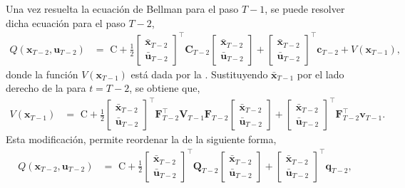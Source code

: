 Una vez resuelta la ecuación de Bellman para el paso $T-1$, se puede resolver dicha ecuación para el paso $T-2$,
\begin{align} \label{eq:Q_T_1}
    Q(\mathbf{x}_{T-2}, \mathbf{u}_{T-2})
    &= \text{ C} 
    +\frac{1}{2}
    \begin{bmatrix}
        \bar{\mathbf{x}}_{T-2} \\
        \bar{\mathbf{u}}_{T-2}
    \end{bmatrix}^{\top}
    \mathbf{C}_{T-2}
    \begin{bmatrix}
        \bar{\mathbf{x}}_{T-2} \\
        \bar{\mathbf{u}}_{T-2}
    \end{bmatrix}
    + 
    \begin{bmatrix}
        \bar{\mathbf{x}}_{T-2} \\
        \bar{\mathbf{u}}_{T-2}
    \end{bmatrix}^{\top}
    \mathbf{c}_{T-2}
    +
    V(\mathbf{x}_{T-1}),
\end{align}
donde la función $V(\mathbf{x}_{T-1})$ está dada por la . Sustituyendo $\bar{\mathbf{x}}_{T-1}$ por el lado derecho de la  para $t=T-2$, se obtiene que, 
\begin{align}
    V(\mathbf{x}_{T-1}) &= \text{ C} 
    + \frac{1}{2}
    \begin{bmatrix}
        \bar{\mathbf{x}}_{T-2}\\
        \bar{\mathbf{u}}_{T-2}
    \end{bmatrix}^{\top}
    \mathbf{F}_{T-2}^{\top} \mathbf{V}_{T-1}
    \mathbf{F}_{T-2}
    \begin{bmatrix}
        \bar{\mathbf{x}}_{T-2}\\
        \bar{\mathbf{u}}_{T-2}
    \end{bmatrix}
    + 
    \begin{bmatrix}
        \bar{\mathbf{x}}_{T-2}\\
        \bar{\mathbf{u}}_{T-2}
    \end{bmatrix}^{\top}
    \mathbf{F}_{T-2}^{\top} 
    \mathbf{v}_{T-1}.
\end{align}
Esta modificación, permite reordenar la  de la siguiente forma,
\begin{align}
    Q(\mathbf{x}_{T-2}, \mathbf{u}_{T-2}) &= 
    \text{ C} 
    + \frac{1}{2} 
    \begin{bmatrix}
        \bar{\mathbf{x}}_{T-2} \\
        \bar{\mathbf{u}}_{T-2}
    \end{bmatrix}^{\top}
    \mathbf{Q}_{T-2} 
    \begin{bmatrix}
        \bar{\mathbf{x}}_{T-2} \\
        \bar{\mathbf{u}}_{T-2}
    \end{bmatrix}
    +
    \begin{bmatrix}
        \bar{\mathbf{x}}_{T-2} \\
        \bar{\mathbf{u}}_{T-2}
    \end{bmatrix}^{\top}
    \mathbf{q}_{T-2},
\end{align}

